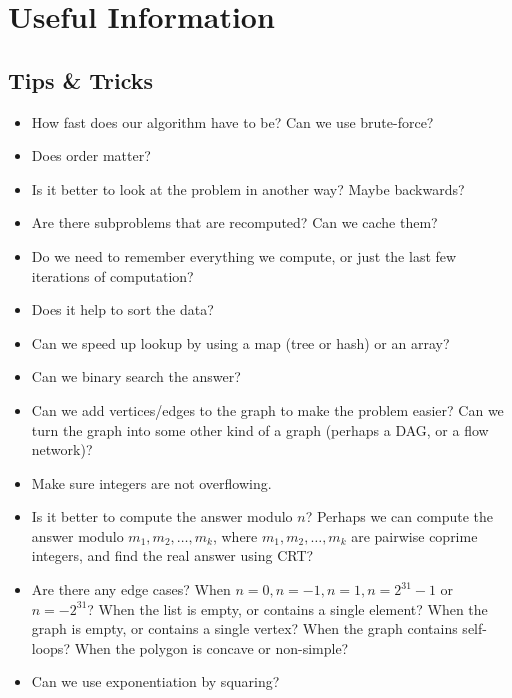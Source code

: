 \documentclass[9pt,a4paper,twocolumn,landscape,oneside]{amsart}
\begin{document}
\section{Useful Information}
    \subsection{Tips \&{} Tricks}
        \begin{itemize}
            \item How fast does our algorithm have to be? Can we use
                brute-force?
            \item Does order matter?
            \item Is it better to look at the problem in another way? Maybe
                backwards?
            \item Are there subproblems that are recomputed? Can we cache them?
            \item Do we need to remember everything we compute, or just the
                last few iterations of computation?
            \item Does it help to sort the data?
            \item Can we speed up lookup by using a map (tree or hash) or an
                array?
            \item Can we binary search the answer?
            \item Can we add vertices/edges to the graph to make the problem
                easier? Can we turn the graph into some other kind of a graph
                (perhaps a DAG, or a flow network)?
            \item Make sure integers are not overflowing.
            \item Is it better to compute the answer modulo $n$? Perhaps we can
                compute the answer modulo $m_1,m_2,\ldots,m_k$, where
                $m_1,m_2,\ldots,m_k$ are pairwise coprime integers, and find
                the real answer using CRT?
            \item Are there any edge cases? When $n=0, n=-1, n=1, n=2^{31}-1$
                or $n=-2^{31}$? When the list is empty, or contains a single
                element? When the graph is empty, or contains a single vertex?
                When the graph contains self-loops?  When the polygon is
                concave or non-simple?
            \item Can we use exponentiation by squaring?
        \end{itemize}
\end{document}

